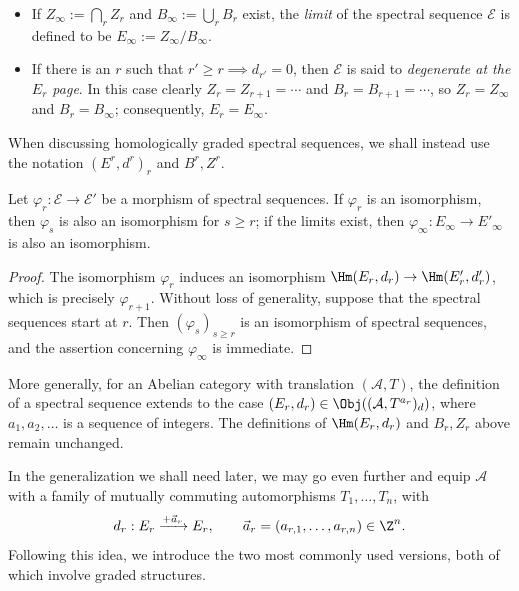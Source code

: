 \begin{itemize}
	\item If $Z_\infty:=\bigcap_rZ_r$ and $B_\infty:=\bigcup_rB_r$ exist, the
	\emph{limit} of the spectral sequence $\mathscr{E}$ is defined to be
	$E_\infty:=Z_\infty/B_\infty$.
	\item If there is an $r$ such that $r'\geq r\implies d_{r'}=0$, then
	$\mathscr{E}$ is said to \emph{degenerate at the $E_r$ page}. In this case
	clearly $Z_r=Z_{r+1}=\cdots$ and $B_r=B_{r+1}=\cdots$, so
	$Z_r=Z_\infty$ and $B_r=B_\infty$; consequently, $E_r=E_\infty$.
\end{itemize}

When discussing homologically graded spectral sequences, we shall instead use
the notation $(E^r,d^r)_r$ and $B^r,Z^r$.

\begin{proposition}\label{prop:ss-isom-infty}
	Let $\varphi_r:\mathscr{E}\to\mathscr{E}'$ be a morphism of spectral
	sequences. If $\varphi_r$ is an isomorphism, then $\varphi_s$ is also an
	isomorphism for $s\geq r$; if the limits exist, then
	$\varphi_\infty:E_\infty\to E'_\infty$ is also an isomorphism.
\end{proposition}
\begin{proof}
	The isomorphism $\varphi_r$ induces an isomorphism
	$\Hm(E_r,d_r)\to\Hm(E'_r,d'_r)$, which is precisely
	$\varphi_{r+1}$. Without loss of generality, suppose that the spectral
	sequences start at $r$. Then $(\varphi_s)_{s\geq r}$ is an isomorphism of
	spectral sequences, and the assertion concerning $\varphi_\infty$ is
	immediate.
\end{proof}

More generally, for an Abelian category with translation $(\mathcal{A},T)$,
the definition of a spectral sequence extends to the case
$(E_r,d_r)\in\Obj((\mathcal{A},T^{a_r})_d)$, where
$a_1,a_2,\ldots$ is a sequence of integers. The definitions of
$\Hm(E_r,d_r)$ and $B_r,Z_r$ above remain unchanged.

In the generalization we shall need later, we may go even further and equip
$\mathcal{A}$ with a family of mutually commuting automorphisms
$T_1,\ldots,T_n$, with
\[ d_r:E_r\xrightarrow{+\vec{a}_r}E_r,\qquad
	\vec{a}_r=(a_{r,1},\ldots,a_{r,n})\in\Z^n. \]
Following this idea, we introduce the two most commonly used versions, both of
which involve graded structures.

